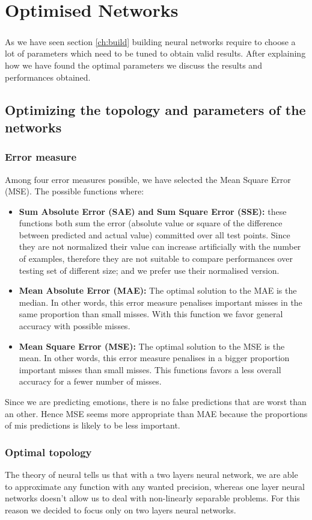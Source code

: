 \documentclass[a4paper,12pt,oneside,final]{report}
\begin{document}
\chapter{Optimised Networks}
\paragraph{}
As we have seen section \ref{ch:build} building neural networks require to choose a lot of parameters which need to be tuned to obtain valid results. After explaining how we have found the optimal parameters we discuss the results and performances obtained.
\section{Optimizing the topology and parameters of the networks}
\subsection{Error measure}
Among four error measures possible, we have selected the Mean Square Error (MSE). The possible functions where:
\begin{itemize}
\item { \bf Sum Absolute Error (SAE) and Sum Square Error (SSE):} these functions both sum the error (absolute value or square of the difference between predicted and actual value) committed over all test points. Since they are not normalized their value can increase artificially with the number of examples, therefore they are not suitable to compare performances over testing set of different size; and we prefer use their normalised version.
\item { \bf Mean Absolute Error (MAE):} The optimal solution to the MAE is the median. In other words, this error measure penalises important misses in the same proportion than small misses. With this function we favor general accuracy with possible misses.
\item { \bf Mean Square Error (MSE):} The optimal solution to the MSE is the mean. In other words, this error measure penalises in a bigger proportion important misses than small misses. This functions favors a less overall accuracy for a fewer number of misses.
\end{itemize}
Since we are predicting emotions, there is no false predictions that are worst than an other. Hence MSE seems more appropriate than MAE because the proportions of mis predictions is likely to be less important.
\subsection{Optimal topology}
The theory of neural tells us that with a two layers neural network, we are able to approximate any function with any wanted precision, whereas one layer neural networks doesn't allow us to deal with non-linearly separable problems. For this reason we decided to focus only on two layers neural networks.
\end{document}
